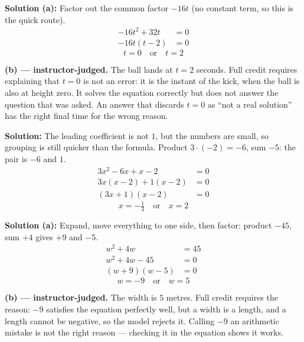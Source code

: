 \documentclass[12pt]{article}
\begin{document}
\textbf{Solution (a):} Factor out the common factor $-16t$ (no constant term, so this is the quick route).
\begin{align*}
  -16t^2 + 32t &= 0 \\
  -16t(t - 2) &= 0
\end{align*}
\[ \boxed{t = 0 \quad \text{or} \quad t = 2} \]

\textbf{(b) --- instructor-judged.} The ball lands at $t = 2$ seconds. Full credit requires explaining that $t = 0$ is not an error: it is the instant of the kick, when the ball is also at height zero. It solves the equation correctly but does not answer the question that was asked. An answer that discards $t = 0$ as ``not a real solution'' has the right final time for the wrong reason.


\textbf{Solution:} The leading coefficient is not $1$, but the numbers are small, so grouping is still quicker than the formula. Product $3 \cdot (-2) = -6$, sum $-5$: the pair is $-6$ and $1$.
\begin{align*}
  3x^2 - 6x + x - 2 &= 0 \\
  3x(x-2) + 1(x-2) &= 0 \\
  (3x+1)(x-2) &= 0
\end{align*}
\[ \boxed{x = -\tfrac{1}{3} \quad \text{or} \quad x = 2} \]


\textbf{Solution (a):} Expand, move everything to one side, then factor: product $-45$, sum $+4$ gives $+9$ and $-5$.
\begin{align*}
  w^2 + 4w &= 45 \\
  w^2 + 4w - 45 &= 0 \\
  (w+9)(w-5) &= 0
\end{align*}
\[ \boxed{w = -9 \quad \text{or} \quad w = 5} \]

\textbf{(b) --- instructor-judged.} The width is $5$ metres. Full credit requires the reason: $-9$ satisfies the equation perfectly well, but a width is a length, and a length cannot be negative, so the model rejects it. Calling $-9$ an arithmetic mistake is not the right reason --- checking it in the equation shows it works.

\end{document}
